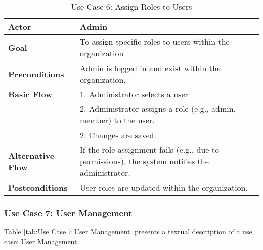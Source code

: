 \begin{table}[ht]
	\centering
	\begin{tabularx}{\textwidth}{|l|X|}
		\hline
		\textbf{Actor}            & Admin                                                               \\
		\hline
		\textbf{Goal}             & To assign specific roles to users within the organization           \\
		\hline
		\textbf{Preconditions}    & Admin is logged in and exist within the organization.               \\
		\hline
		\textbf{Basic Flow}       & 1. Administrator selects a user                                     \\
		                          & 2. Administrator assigns a role (e.g., admin, member) to the user.  \\
		                          & 2. Changes are saved.                                               \\
		\hline
		\textbf{Alternative Flow} &
		If the role assignment fails (e.g., due to permissions), the system notifies the administrator. \\
		\hline
		\textbf{Postconditions}   & User roles are updated within the organization.                     \\
		\hline
	\end{tabularx}
	\caption{Use Case 6: Assign Roles to Users}
	\label{tab:Use Case 6 Assign Roles to Users}
\end{table}

\subsubsection{Use Case 7: User Management}

Table \ref{tab:Use Case 7 User Management} presents a textual description of a use case: User Management.

